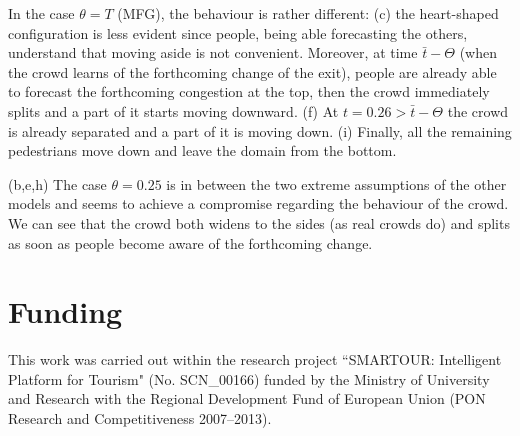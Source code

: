 \documentclass{cmslatex}
\begin{document}
In the case $\theta=T$ (MFG), the behaviour is rather different: 
(c) the heart-shaped configuration is less evident since people, being able forecasting the others, understand that moving aside is not convenient. 
Moreover, at time $\bar t-\Theta$ (when the crowd learns of the forthcoming change of the exit), people are already able to forecast the forthcoming congestion at the top, then the crowd immediately splits and a part of it starts moving downward. 
(f) At $t=0.26>\bar t-\Theta$ the crowd is already separated and a part of it is moving down.
(i) Finally, all the remaining pedestrians move down and leave the domain from the bottom.

(b,e,h) The case $\theta=0.25$ is in between the two extreme assumptions of the other models and seems to achieve a compromise regarding the behaviour of the crowd. 
We can see that the crowd both widens to the sides (as real crowds do) and splits as soon as people become aware of the forthcoming change.  



\section*{Funding}
This work was carried out within the research project ``SMARTOUR: Intelligent Platform for Tourism" (No. SCN\_00166) funded by the Ministry of University and Research with the Regional Development Fund of European Union (PON Research and Competitiveness 2007–2013). 
\end{document}
